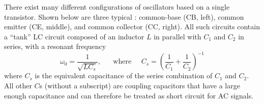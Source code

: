 \documentclass{article}
\begin{document}
\begin{comment}
The op-amp circuit shown in the figure has both positive and negative
feedback branches. If the voltage to non-inverting input $V_+$ is 
considered as the input, the circuit is a non-inverting amplifier 
with gain:
\begin{equation}
A=\frac{V_o}{V_+}=1+\frac{R_f}{R_3}=K
\end{equation}
On the other hand, the positive feedback gain is
\begin{equation}
B(j\omega)=\frac{V_+}{V'_o}=\frac{Z_1}{Z_1+Z_2}
=\frac{R_1||1/j\omega C_1}{R_1||1/j\omega C_1+R_2+1/j\omega C_2}
\end{equation}
\end{comment}

There exist many different configurations of oscillators based on a
single transistor. Shown below are three typical 
:
common-base (CB, left), common emitter (CE, middle), and common 
collector (CC, right). All such circuits contain a ``tank'' LC circuit
composed of an inductor $L$ in parallel with $C_1$ and $C_2$ in series, 
with a resonant frequency 
\begin{equation}
\omega_0=\frac{1}{\sqrt{LC_s}},\;\;\;\;\;\;\mbox{where}\;\;\;\;\;
C_s=\left(\frac{1}{C_1}+\frac{1}{C_2}\right)^{-1}
\end{equation}
where $C_s$ is the equivalent capacitance of the series combination 
of $C_1$ and $C_2$. All other $C$s (without a subscript) are coupling
capacitors that have a large enough capacitance and can therefore be 
treated as short circuit for AC signals. 

\end{document}

